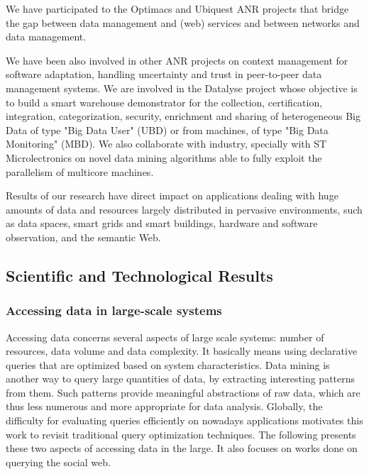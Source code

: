 We have participated to the Optimacs and Ubiquest ANR projects that bridge the gap between data management and (web) services and  between networks and data management.   

We have been also involved in other ANR projects on context management for software adaptation, handling uncertainty and trust in peer-to-peer data management systems. We are involved in the Datalyse project whose objective is to build a smart warehouse demonstrator for the collection, certification, integration, categorization, security, enrichment and sharing of heterogeneous Big Data  of type "Big Data User" (UBD) or from machines, of type "Big Data Monitoring" (MBD). 
We also collaborate with industry, specially with ST Microlectronics on novel data mining algorithms able to fully exploit the parallelism of multicore machines. 

Results of our research have direct impact on applications dealing with huge amounts of data and resources largely distributed in pervasive environments, such as data spaces, smart grids and smart buildings, hardware and software observation, and the semantic Web.

\subsection{Scientific and Technological Results} %
\label{sub:hadas_scientific_and_technological_results}

\subsubsection{Accessing data in large-scale systems}
\label{optimisation}


Accessing data concerns several aspects of large scale systems: number of resources, data volume and data complexity. It basically means using declarative queries that are optimized based on system characteristics.
Data mining is another way to query large quantities of data, by extracting interesting patterns from them. Such patterns provide meaningful abstractions of raw data, which are thus less numerous and more appropriate for data analysis. 
Globally, the difficulty for evaluating queries efficiently on nowadays applications motivates this work to revisit traditional query optimization techniques. The following presents these two aspects of accessing data in the large. It also focuses on works done on querying the social web. 

